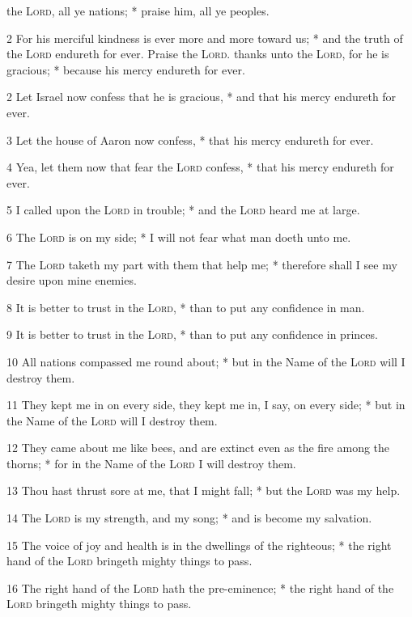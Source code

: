  the {\textsc{Lord}}, all ye nations; * praise him, all ye peoples.\par
2 For his merciful kindness is ever more and more toward us; * and the truth of the {\textsc{Lord}} endureth for ever. Praise the {\textsc{Lord}}.
 thanks unto the {\textsc{Lord}}, for he is gracious; * because his mercy endureth for ever.\par
2 Let Israel now confess that he is gracious, * and that his mercy endureth for ever.\par
3 Let the house of Aaron now confess, * that his mercy endureth for ever.\par
4 Yea, let them now that fear the {\textsc{Lord}} confess, * that his mercy endureth for ever.\par
5 I called upon the {\textsc{Lord}} in trouble; * and the {\textsc{Lord}} heard me at large.\par
6 The {\textsc{Lord}} is on my side; * I will not fear what man doeth unto me.\par
7 The {\textsc{Lord}} taketh my part with them that help me; * therefore shall I see my desire upon mine enemies.\par
8 It is better to trust in the {\textsc{Lord}}, * than to put any confidence in man.\par
9 It is better to trust in the {\textsc{Lord}}, * than to put any confidence in princes.\par
10 All nations compassed me round about; * but in the Name of the {\textsc{Lord}} will I destroy them.\par
11 They kept me in on every side, they kept me in, I say, on every side; * but in the Name of the {\textsc{Lord}} will I destroy them.\par
12 They came about me like bees, and are extinct even as the fire among the thorns; * for in the Name of the {\textsc{Lord}} I will destroy them.\par
13 Thou hast thrust sore at me, that I might fall; * but the {\textsc{Lord}} was my help.\par
14 The {\textsc{Lord}} is my strength, and my song; * and is become my salvation.\par
15 The voice of joy and health is in the dwellings of the righteous; * the right hand of the {\textsc{Lord}} bringeth mighty things to pass.\par
16 The right hand of the {\textsc{Lord}} hath the pre-eminence; * the right hand of the {\textsc{Lord}} bringeth mighty things to pass.\par
